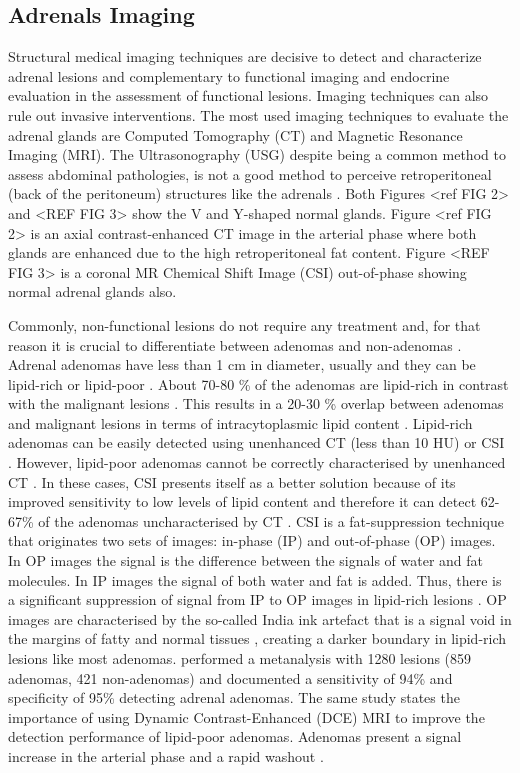 \documentclass{article}
\begin{document}
\subsection{Adrenals Imaging}

Structural medical imaging techniques are decisive to detect and characterize adrenal lesions and complementary to functional imaging and endocrine evaluation in the assessment of functional lesions. Imaging techniques can also rule out invasive interventions. The most used imaging techniques to evaluate the adrenal glands are Computed Tomography (CT) and Magnetic Resonance Imaging (MRI). The Ultrasonography (USG) despite being a common method to assess abdominal pathologies, is not a good method to perceive retroperitoneal (back of the peritoneum) structures like the adrenals \cite{Panda2015}. Both Figures <ref FIG 2> and <REF FIG 3> show the V and Y-shaped normal glands. Figure <ref FIG 2> is an axial contrast-enhanced CT image in the arterial phase where both glands are enhanced due to the high retroperitoneal fat content. Figure <REF FIG 3> is a coronal MR Chemical Shift Image (CSI) out-of-phase showing normal adrenal glands also.

Commonly, non-functional lesions do not require any treatment and, for that reason it is crucial to differentiate between adenomas and non-adenomas \cite{Platzek2019}. Adrenal adenomas have less than 1 cm in diameter, usually and they can be lipid-rich or lipid-poor \cite{Panda2015}. About 70-80 \% of the adenomas are lipid-rich in contrast with the malignant lesions \cite{Platzek2019}. This results in a 20-30 \% overlap between adenomas and malignant lesions in terms of intracytoplasmic lipid content \cite{Israel2004}. Lipid-rich adenomas can be easily detected using unenhanced CT (less than 10 HU) \cite{Panda2015} or CSI \cite{Platzek2019}. However, lipid-poor adenomas cannot be correctly characterised by unenhanced CT \cite{Israel2004}. In these cases, CSI presents itself as a better solution because of its improved sensitivity to low levels of lipid content and therefore it can detect 62-67\% of the adenomas uncharacterised by CT \cite{Israel2004}. CSI is a fat-suppression technique that originates two sets of images: in-phase (IP) and out-of-phase (OP) images. In OP images the signal is the difference between the signals of water and fat molecules. In IP images the signal of both water and fat is added. Thus, there is a significant suppression of signal from IP to OP images in lipid-rich lesions \cite{Jahanvi2021}. OP images are characterised by the so-called India ink artefact that is a signal void in the margins of fatty and normal tissues \cite{Jahanvi2021}, creating a darker boundary in lipid-rich lesions like most adenomas. \cite{Platzek2019} performed a metanalysis with 1280 lesions (859 adenomas, 421 non-adenomas) and documented a sensitivity of 94\% and specificity of 95\% detecting adrenal adenomas. The same study states the importance of using Dynamic Contrast-Enhanced (DCE) MRI to improve the detection performance of lipid-poor adenomas. Adenomas present a signal increase in the arterial phase and a rapid washout \cite{Chung2001}.
\end{document}
